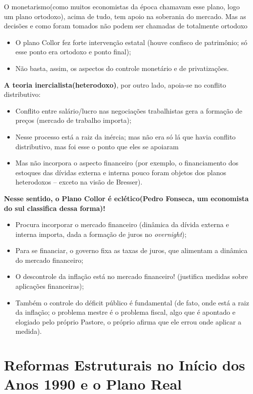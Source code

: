 \documentclass[a4paper,12pt]{article}[abntex2]
\begin{document}
O monetarismo(como muitos economistas da época chamavam esse plano, logo um plano ortodoxo), acima de tudo, tem apoio na soberania do mercado. Mas as decisões e como foram tomados não podem ser chamadas de totalmente ortodoxo\begin{itemize}
    \item O plano Collor fez forte intervenção estatal (houve confisco de patrimônio; só esse ponto era ortodoxo e ponto final);
    \item Não basta, assim, os aspectos do controle monetário e de privatizações.
\end{itemize}

\textbf{A teoria inercialista(heterodoxo)}, por outro lado, apoia-se no conflito distributivo:\begin{itemize}
    \item Conflito entre salário/lucro nas negociações trabalhistas gera a formação de preços (mercado de trabalho importa);
    \item Nesse processo está a raiz da inércia; mas não era só lá que havia conflito distributivo, mas foi esse o ponto que eles se apoiaram
    \item Mas não incorpora o aspecto financeiro (por exemplo, o financiamento dos estoques das dívidas externa e interna pouco foram objetos dos planos heterodoxos – exceto na visão de Bresser).
\end{itemize}

\textbf{Nesse sentido, o Plano Collor é eclético(Pedro Fonseca, um economista do sul classifica dessa forma)!}
\begin{itemize}
    \item Procura incorporar o mercado financeiro (dinâmica da dívida externa e interna importa, dada a formação de juros no \textit{overnight});
    \item Para se financiar, o governo fixa as taxas de juros, que alimentam a dinâmica do mercado financeiro;
    \item O descontrole da inflação está no mercado financeiro! (justifica medidas sobre aplicações financeiras);
    \item Também o controle do déficit público é fundamental (de fato, onde está a raiz da inflação; o problema mestre é o problema fiscal, algo que é apontado e elogiado pelo próprio Pastore, o próprio afirma que ele errou onde aplicar a medida).
\end{itemize}

\newpage
\section{\textbf{Reformas Estruturais no Início dos Anos 1990 e o Plano Real}}
\end{document}
